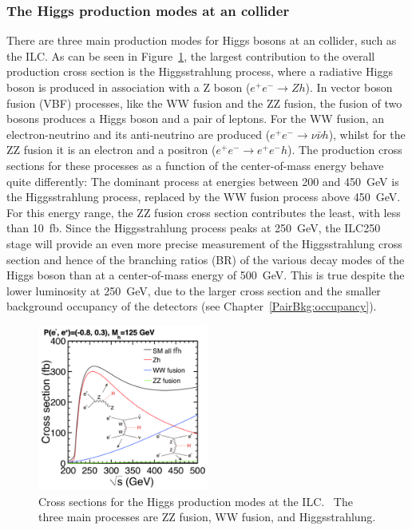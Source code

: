 \subsubsection{The Higgs production modes at an \positron\electron collider}
There are three main production modes for Higgs bosons at an \positron\electron collider, such as the ILC.
As can be seen in Figure~\ref{fig:HiggsProduction}, the largest contribution to the overall production cross section is the Higgsstrahlung process, where a radiative Higgs boson is produced in association with a Z boson ($e^+e^-\rightarrow Zh$).
In vector boson fusion (VBF) processes, like the WW fusion and the ZZ fusion, the fusion of two bosons produces a Higgs boson and a pair of leptons.
For the WW fusion, an electron-neutrino and its anti-neutrino are produced ($e^+e^-\rightarrow \nu\bar{\nu} h$), whilst for the ZZ fusion it is an electron and a positron ($e^+e^-\rightarrow e^+e^-h$).
The production cross sections for these processes as a function of the center-of-mass energy behave quite differently:
The dominant process at energies between 200 and \SI{450}{\GeV} is the Higgsstrahlung process, replaced by the WW fusion process above \SI{450}{\GeV}.
For this energy range, the ZZ fusion cross section contributes the least, with less than \SI{10}{fb}.
Since the Higgsstrahlung process peaks at \SI{250}{\GeV}, the ILC250 stage will provide an even more precise measurement of the Higgsstrahlung cross section and hence of the branching ratios (BR) of the various decay modes of the Higgs boson than at a center-of-mass energy of \SI{500}{\GeV}.
This is true despite the lower luminosity at \SI{250}{\GeV}, due to the larger cross section and the smaller background occupancy of the detectors (see Chapter~\ref{PairBkg:occupancy}).
\begin{figure}
\centering
\includegraphics[width=0.5\textwidth]{Figures/HiggsProductionCrossSection.png}
\caption[Cross section for the Higgs production modes at ILC]{Cross sections for the Higgs production modes at the ILC.~\cite[p. 13]{PhysicsCase}
The three main processes are ZZ fusion, WW fusion, and Higgsstrahlung.}
\label{fig:HiggsProduction}
\end{figure}

